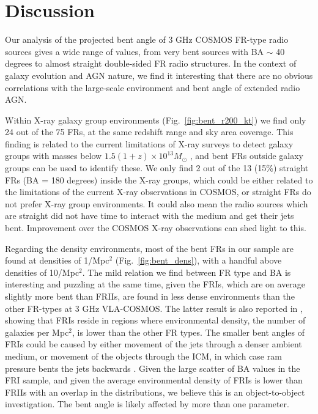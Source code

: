 \documentclass[galaxies,article,submit,moreauthors,pdftex]{Definitions/mdpi}
\begin{document}
 


\section{Discussion}

Our analysis of the projected bent angle of 3 GHz COSMOS FR-type radio sources gives a wide range of values, from very bent sources with BA $\sim$ 40 degrees to almost straight double-sided FR radio structures. In the context of galaxy evolution and AGN nature, we find it interesting that there are no obvious correlations with the large-scale environment and bent angle of extended radio AGN. 

Within X-ray galaxy group environments (Fig.~\ref{fig:bent_r200_kt}) we find only 24 out of the 75 FRs, at the same redshift range and sky area coverage. This finding is related to the current limitations of X-ray surveys to detect galaxy groups with masses below $1.5 (1 + z) \times 10^{13}M_{\odot}$ \cite{vardoulaki19}, and bent FRs outside galaxy groups can be used to identify these. We only find 2 out of the 13 (15\%) straight FRs (BA = 180 degrees) inside the X-ray groups, which could be either related to the limitations of the current X-ray observations in COSMOS, or straight FRs do not prefer X-ray group environments. It could also mean the radio sources which are straight did not have time to interact with the medium and get their jets bent. Improvement over the COSMOS X-ray observations can shed light to this. 

Regarding the density environments, most of the bent FRs in our sample are found at densities of 1/Mpc$^{2}$ (Fig.~\ref{fig:bent_dens}), with a handful above densities of 10/Mpc$^{2}$. The mild relation we find between FR type and BA is interesting and puzzling at the same time, given the FRIs, which are on average slightly more bent than FRIIs, are found in less dense environments than the other FR-types at 3 GHz VLA-COSMOS. The latter result is also reported in \cite{vardoulaki21}, showing that FRIs reside in regions where environmental density, the number of galaxies per Mpc$^{2}$, is lower than the other FR types. The smaller bent angles of FRIs could be caused by either movement of the jets through a denser ambient medium, or movement of the objects through the ICM, in which case ram pressure bents the jets backwards  \citep[e.g.][]{smolcic07}. Given the large scatter of BA values in the FRI sample, and given the average environmental density of FRIs is lower than FRIIs with an overlap in the distributions, we believe this is an object-to-object investigation. The bent angle is likely affected by more than one parameter. 
\end{document}
